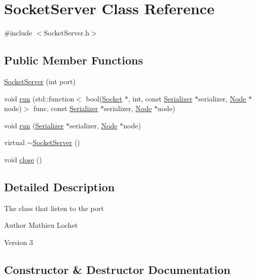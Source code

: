 \hypertarget{classSocketServer}{}\section{Socket\+Server Class Reference}
\label{classSocketServer}


{\ttfamily \#include $<$Socket\+Server.\+h$>$}

\subsection*{Public Member Functions}
\begin{DoxyCompactItemize}
\item 
\mbox{\hyperlink{classSocketServer_a73939197c857f63eede6fc2f0c6ab433}{Socket\+Server}} (int port)
\item 
void \mbox{\hyperlink{classSocketServer_a2876604e63911e2097385e235a8592cb}{run}} (std\+::function$<$ bool(\mbox{\hyperlink{classSocket}{Socket}} $\ast$, int, const \mbox{\hyperlink{classSerializer}{Serializer}} $\ast$serializer, \mbox{\hyperlink{classNode}{Node}} $\ast$node)$>$ func, const \mbox{\hyperlink{classSerializer}{Serializer}} $\ast$serializer, \mbox{\hyperlink{classNode}{Node}} $\ast$node)
\item 
void \mbox{\hyperlink{classSocketServer_aaaa3c5145b286c3d492f9bf1bec5a5dc}{run}} (\mbox{\hyperlink{classSerializer}{Serializer}} $\ast$serializer, \mbox{\hyperlink{classNode}{Node}} $\ast$node)
\item 
virtual \mbox{\hyperlink{classSocketServer_af0e595690e453ef4b8e8da174069aba9}{$\sim$\+Socket\+Server}} ()
\item 
void \mbox{\hyperlink{classSocketServer_a1e673e526a459bdb3ca92e103ec212ae}{close}} ()
\end{DoxyCompactItemize}


\subsection{Detailed Description}
The class that listen to the port

\begin{DoxyAuthor}{Author}
Mathieu Lochet 
\end{DoxyAuthor}
\begin{DoxyVersion}{Version}
3 
\end{DoxyVersion}


\subsection{Constructor \& Destructor Documentation}
\mbox{\label{classSocketServer_a73939197c857f63eede6fc2f0c6ab433}} 
